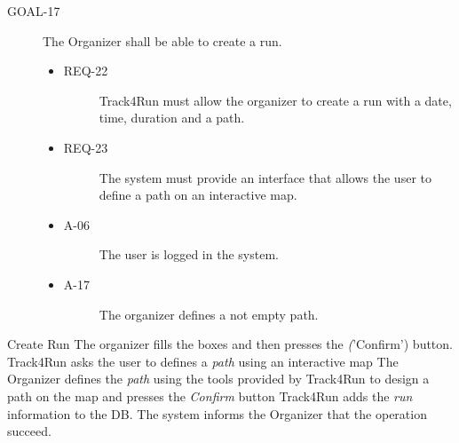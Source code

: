 \documentclass[a4paper]{article}
\newcommand{\requirement}{\ding{229}}%
\begin{document}
         \begin{description}
        	\item[GOAL-17] The Organizer shall be able to create a run.
            	\begin{itemize}
            	    \item[\requirement]
                	\begin{description}
                	\item[REQ-22] Track4Run must allow the organizer to create a run with a date, time, duration and a path.
                	\end{description}
                	\item[\requirement]
                	\begin{description}
                	\item[REQ-23] The system must provide an interface that allows the user to define a path on an interactive map.
                	\end{description}
                	\item
                	\begin{description}
                	\item[A-06] The user is logged in the system.
                	\end{description}
                	\item
                	\begin{description}
                	\item[A-17] The organizer defines a not empty path.
                	\end{description}
                	
                	\end{itemize}
        \end{description}
        
         \begin{usecase}{Create Run}
              {The organizer fills the boxes and then presses the \textit('Confirm') button.}
              {Track4Run asks the user to defines a \textit{path} using an interactive map}
              {The Organizer defines the \textit{path} using the tools provided by Track4Run to design a path on the map and presses the \textit{Confirm} button}
              {Track4Run adds the \textit{run} information to the DB.}
              {The system informs the Organizer that the operation succeed.}
        \end{usecase}
        
\end{document}
